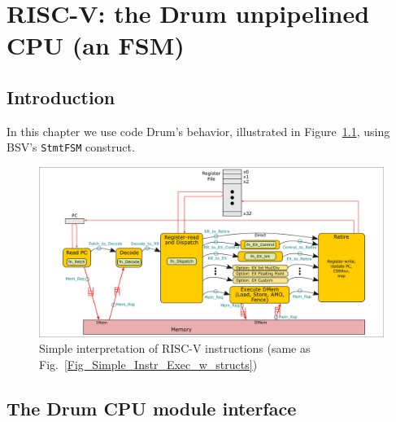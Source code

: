 

\chapter{RISC-V: the Drum unpipelined CPU (an FSM)}


\setcounter{page}{1}
\renewcommand{\thepage}{\arabic{chapter}-\arabic{page}}

\label{ch_Drum_code}


\section{Introduction}

In this chapter we use code Drum's behavior, illustrated in
Figure~\ref{Fig_Drum_Instr_Exec}, using BSV's \verb|StmtFSM|
construct.
\begin{figure}[htbp]
  \centerline{\includegraphics[width=6in,angle=0]{Figures/Fig_Instr_Exec_w_structs}}
  \caption{\label{Fig_Drum_Instr_Exec}
           Simple interpretation of RISC-V instructions
	   (same as Fig.~\ref{Fig_Simple_Instr_Exec_w_structs})}
\end{figure}


\section{The Drum CPU module interface}

